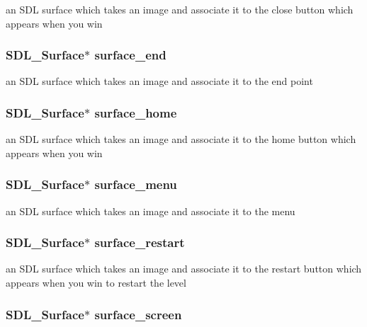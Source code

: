 an S\-D\-L surface which takes an image and associate it to the close button which appears when you win \hypertarget{structsdl_game_a910871d96b4426f5729b94901bf9e0f6}{
\subsubsection[{surface\-\_\-end}]{\setlength{\rightskip}{0pt plus 5cm}S\-D\-L\-\_\-\-Surface$\ast$ surface\-\_\-end}}\label{structsdl_game_a910871d96b4426f5729b94901bf9e0f6}
an S\-D\-L surface which takes an image and associate it to the end point \hypertarget{structsdl_game_a103a17f5a7a4b3f1db83e4e109871210}{
\subsubsection[{surface\-\_\-home}]{\setlength{\rightskip}{0pt plus 5cm}S\-D\-L\-\_\-\-Surface$\ast$ surface\-\_\-home}}\label{structsdl_game_a103a17f5a7a4b3f1db83e4e109871210}
an S\-D\-L surface which takes an image and associate it to the home button which appears when you win \hypertarget{structsdl_game_a29c6542f0f27a5c7d75584b0332818b1}{
\subsubsection[{surface\-\_\-menu}]{\setlength{\rightskip}{0pt plus 5cm}S\-D\-L\-\_\-\-Surface$\ast$ surface\-\_\-menu}}\label{structsdl_game_a29c6542f0f27a5c7d75584b0332818b1}
an S\-D\-L surface which takes an image and associate it to the menu \hypertarget{structsdl_game_a33238e5f47ca5c025e8fbeeab80e6e13}{
\subsubsection[{surface\-\_\-restart}]{\setlength{\rightskip}{0pt plus 5cm}S\-D\-L\-\_\-\-Surface$\ast$ surface\-\_\-restart}}\label{structsdl_game_a33238e5f47ca5c025e8fbeeab80e6e13}
an S\-D\-L surface which takes an image and associate it to the restart button which appears when you win to restart the level \hypertarget{structsdl_game_add1b6b922a3601ae4115805c3a41fa8d}{
\subsubsection[{surface\-\_\-screen}]{\setlength{\rightskip}{0pt plus 5cm}S\-D\-L\-\_\-\-Surface$\ast$ surface\-\_\-screen}}\label{structsdl_game_add1b6b922a3601ae4115805c3a41fa8d}
